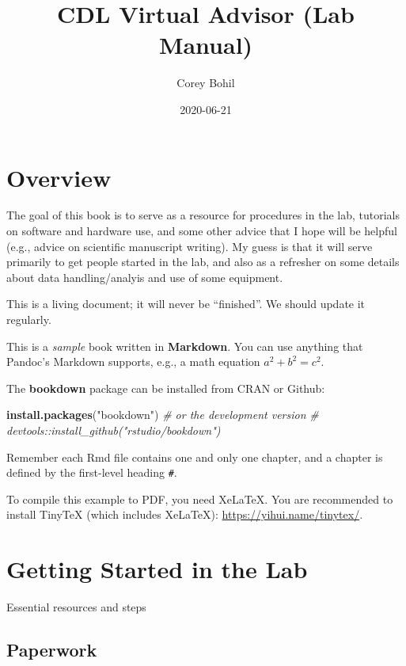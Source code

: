 \documentclass[
]{book}
\title{CDL Virtual Advisor (Lab Manual)}
\author{Corey Bohil}
\date{2020-06-21}
\newenvironment{Shaded}{\begin{snugshade}}{\end{snugshade}}
\newcommand{\CommentTok}[1]{\textcolor[rgb]{0.56,0.35,0.01}{\textit{#1}}}
\newcommand{\KeywordTok}[1]{\textcolor[rgb]{0.13,0.29,0.53}{\textbf{#1}}}
\newcommand{\NormalTok}[1]{#1}
\newcommand{\StringTok}[1]{\textcolor[rgb]{0.31,0.60,0.02}{#1}}
\begin{document}
\maketitle

{
\setcounter{tocdepth}{1}
\tableofcontents
}
\hypertarget{overview}{%
\chapter{Overview}\label{overview}}

The goal of this book is to serve as a resource for procedures in the lab, tutorials on software and hardware use, and some other advice that I hope will be helpful (e.g., advice on scientific manuscript writing). My guess is that it will serve primarily to get people started in the lab, and also as a refresher on some details about data handling/analyis and use of some equipment.

This is a living document; it will never be ``finished''. We should update it regularly.

This is a \emph{sample} book written in \textbf{Markdown}. You can use anything that Pandoc's Markdown supports, e.g., a math equation \(a^2 + b^2 = c^2\).

The \textbf{bookdown} package can be installed from CRAN or Github:

\begin{Shaded}
\begin{Highlighting}[]
\KeywordTok{install.packages}\NormalTok{(}\StringTok{"bookdown"}\NormalTok{)}
\CommentTok{# or the development version}
\CommentTok{# devtools::install_github("rstudio/bookdown")}
\end{Highlighting}
\end{Shaded}

Remember each Rmd file contains one and only one chapter, and a chapter is defined by the first-level heading \texttt{\#}.

To compile this example to PDF, you need XeLaTeX. You are recommended to install TinyTeX (which includes XeLaTeX): \url{https://yihui.name/tinytex/}.

\hypertarget{getting_started}{%
\chapter{Getting Started in the Lab}\label{getting_started}}

Essential resources and steps

\hypertarget{paperwork}{%
\section{Paperwork}\label{paperwork}}
\end{document}
